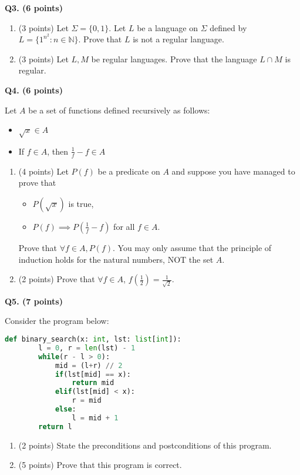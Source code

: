 \documentclass{article}
\begin{document}
    \newpage

    \textbf{Q3. (6 points)}

    \begin{enumerate}[label=\alph*)]
        \item (3 points) Let \(\Sigma = \{0, 1\}\). Let \(L\) be a language on \(\Sigma\) defined by \(L = \{1^{n^2} : n \in \mathbb{N}\}\). Prove that \(L\) is not a regular language.
        \vfill
        \item (3 points) Let \(L, M\) be regular languages. Prove that the language \(L \cap M\) is regular.
        \vfill
    \end{enumerate}

    \newpage

    \textbf{Q4. (6 points)}

    Let \(A\) be a set of functions defined recursively as follows:
    \begin{itemize}
        \item \(\sqrt{x} \in A\) 
        \item If \(f \in A\), then \(\frac{1}{f} - f \in A\) 
    \end{itemize}
    
    \begin{enumerate}[label=\alph*)]
        \item (4 points) Let \(P(f)\) be a predicate on \(A\) and suppose you have managed to prove that
        \begin{itemize}
            \item \(P(\sqrt{x})\) is true,
            \item \(P(f) \implies P(\frac{1}{f} - f)\) for all \(f \in A\).
        \end{itemize}
        Prove that \(\forall f \in A, P(f)\). You may only assume that the principle of induction holds for the natural numbers, NOT the set \(A\).
        \vfill
        \item (2 points) Prove that \(\forall f \in A\), \(f \left( \frac{1}{2} \right) = \frac{1}{\sqrt{2}}\).
        \vfill
    \end{enumerate}

    \newpage

    \textbf{Q5. (7 points)}

    Consider the program below:
    \begin{lstlisting}[language=Python]
    def binary_search(x: int, lst: list[int]):
        l = 0, r = len(lst) - 1
        while(r - l > 0):
            mid = (l+r) // 2
            if(lst[mid] == x):
                return mid
            elif(lst[mid] < x):
                r = mid
            else:
                l = mid + 1
        return l
    \end{lstlisting}
    \begin{enumerate}[label=\alph*)]
        \item (2 points) State the preconditions and postconditions of this program.
        \bigskip
        \item (5 points) Prove that this program is correct.
    \end{enumerate}
    \newpage
\end{document}
